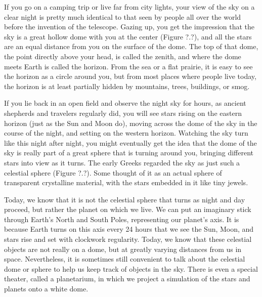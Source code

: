 \documentclass[main.tex]{subfiles}
\begin{document}
If you go on a camping trip or live far from city lights, your view of the sky on a clear night is pretty much identical to that seen by people all over the world before the invention of the telescope. Gazing up, you get the impression that the sky is a great hollow dome with you at the center (Figure ?.?), and all the stars are an equal distance from you on the surface of the dome. The top of that dome, the point directly above your head, is called the \gls{zenith}, and where the dome meets Earth is called the \gls{horizon}. From the sea or a flat prairie, it is easy to see the horizon as a circle around you, but from most places where people live today, the horizon is at least partially hidden by mountains, trees, buildings, or smog.


\vspace{1em}

If you lie back in an open field and observe the night sky for hours, as ancient shepherds and travelers regularly did, you will see stars rising on the eastern horizon (just as the Sun and Moon do), moving across the dome of the sky in the course of the night, and setting on the western horizon. Watching the sky turn like this night after night, you might eventually get the idea that the dome of the sky is really part of a great sphere that is turning around you, bringing different stars into view as it turns. The early Greeks regarded the sky as just such a celestial sphere (Figure ?.?). Some thought of it as an actual sphere of transparent crystalline material, with the stars embedded in it like tiny jewels.

\vspace{1em}

Today, we know that it is not the celestial sphere that turns as night and day proceed, but rather the planet on which we live. We can put an imaginary stick through Earth's North and South Poles, representing our planet's axis. It is because Earth turns on this axis every 24 hours that we see the Sun, Moon, and stars rise and set with clockwork regularity. Today, we know that these celestial objects are not really on a dome, but at greatly varying distances from us in space. Nevertheless, it is sometimes still convenient to talk about the celestial dome or sphere to help us keep track of objects in the sky. There is even a special theater, called a planetarium, in which we project a simulation of the stars and planets onto a white dome.

\vspace{1em}
\end{document}
